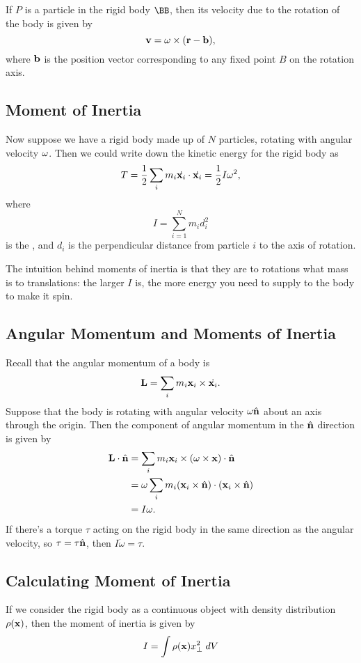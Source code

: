 \documentclass[a4paper]{scrartcl}
\newcommand{\hh}[1]{\hat{\vv{#1}}}
\begin{document}
If $P$ is a particle in the rigid body $\BB$, then its velocity due to the rotation of the body is given by
$$
\mathbf{v} = \mathbf{\omega} \times (\mathbf{r} - \mathbf{b}),
$$
where $\mathbf{b}$ is the position vector corresponding to any fixed point $B$ on the rotation axis.

\subsection{Moment of Inertia}

Now suppose we have a rigid body made up of $N$ particles, rotating with angular velocity $\mathbf{\omega}$. Then we could write down the kinetic energy for the rigid body as
$$
T = \frac{1}{2} \sum_{i} m_i  \dot{\mathbf{x}_i} \cdot \dot{\mathbf{x}_i} = \frac{1}{2}I \omega^2,
$$
where
$$
I = \sum_{i = 1}^N m_i d_i^2
$$
is the , and $d_i$ is the perpendicular distance from particle $i$ to the axis of rotation.

The intuition behind moments of inertia is that they are to rotations what mass is to translations: the larger $I$ is, the more energy you need to supply to the body to make it spin.

\subsection{Angular Momentum and Moments of Inertia}

Recall that the angular momentum of a body is
$$
\mathbf{L} = \sum_i m_i \mathbf{x}_i \times  \dot{\mathbf{x}_i}.
$$
Suppose that the body is rotating with angular velocity $\omega \hh n$ about an axis through the origin. Then the component of angular momentum in the $\hh n$ direction is given by
\begin{align*}
	\vv L \cdot \hh n &= \sum_i m_i \vv x_i \times (\vv \omega \times \vv x) \cdot \hh n \\
	&= \omega \sum_i m_i (\vv x_i \times \hh n) \cdot (\vv x_i \times \hh n) \\
	&= I \omega.
\end{align*}
If there's a torque $\tau$ acting on the rigid body in the same direction as the angular velocity, so $\vv \tau = \tau \hh n$, then $I \dot{\omega} = \tau$.

\subsection{Calculating Moment of Inertia}

If we consider the rigid body as a continuous object with density distribution $\rho (\mathbf{x})$, then the moment of inertia is given by
$$
I = \int \rho (\mathbf{x}) x_{\perp}^2 \; dV
$$
\end{document}
